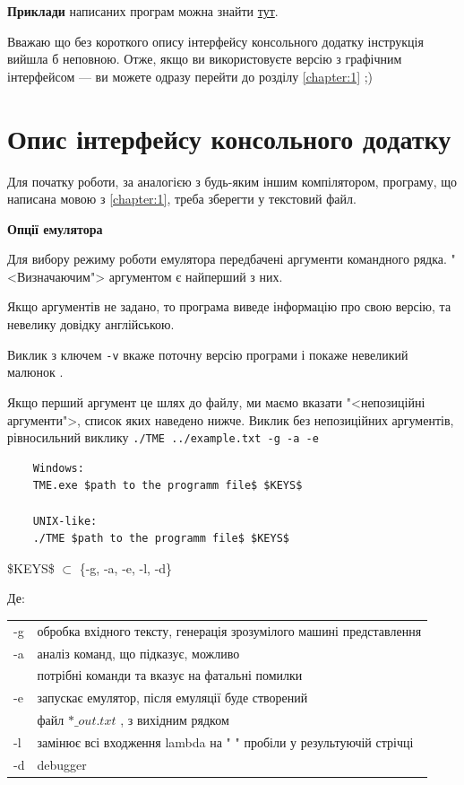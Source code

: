 \documentclass[oneside,final,14pt]{extreport}
\begin{document}
{\bf Приклади} написаних програм можна знайти \href{https://github.com/Kaifolog/TME/tree/master/examples}{тут}.

\bigskip

Вважаю що без короткого опису інтерфейсу консольного додатку інструкція вийшла б неповною. Отже, якщо ви використовуєте версію з графічним інтерфейсом --- ви можете одразу перейти до розділу \ref{chapter:1} ;)

\section{Опис інтерфейсу консольного додатку}
Для початку роботи, за аналогією з будь-яким іншим компілятором, програму, що написана мовою з \ref{chapter:1}, треба зберегти у текстовий файл.

\bigskip

{ \bf Опції емулятора }
	
 Для вибору режиму роботи емулятора передбачені аргументи командного рядка. "<Визначаючим"> аргументом є найперший з них.
		
Якщо аргументів не задано, то програма виведе інформацію про свою версію, та невелику довідку англійською.

Виклик з ключем \texttt{-v} вкаже поточну версію програми і покаже невеликий малюнок \smiley{}.

Якщо перший аргумент це шлях до файлу, ми маємо вказати "<непозиційні аргументи">, список яких наведено нижче. Виклик без непозиційних аргументів, рівносильний виклику \texttt{./TME ../example.txt -g -a -e}
	
		
\begin{tcolorbox}	
\begin{verbatim}
	Windows:
	TME.exe $path to the programm file$ $KEYS$

	UNIX-like:
	./TME $path to the programm file$ $KEYS$
\end{verbatim}
\end{tcolorbox}
		

\$KEYS\$ $\subset$ \{-g, -a, -e, -l, -d\}
			
		
		Де:
		
		
\begin{tabular}{ l l }
	-g & обробка вхідного тексту, генерація зрозумілого машині представлення \\
	-a & аналіз команд, що підказує, можливо \\
	   & потрібні команди та вказує на фатальні помилки \\
	-e & запускає емулятор, після емуляції буде створений\\
	   &  файл $*\_out.txt$ , з вихідним рядком \\
	-l & замінює всі входження lambda на " " пробіли у результуючій стрічці\\
	-d & debugger\\ 
\end{tabular}
\end{document}
